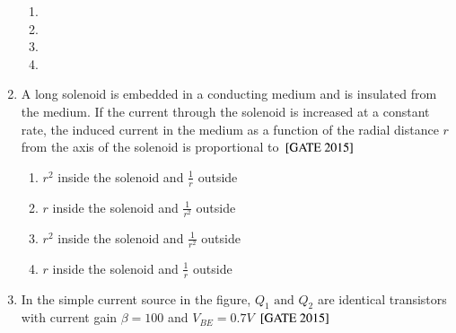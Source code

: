 \documentclass[journal]{IEEEtran}
\begin{document}
\begin{enumerate}
\begin{figure}[!ht]
\label{fig:my_label}
\end{figure}
\begin{multicols}{2}
\begin{enumerate}
   \item 
  \item 
   \columnbreak
    \item  
   \item {}%
      
    
\end{enumerate}
    
\end{multicols}


\item A long solenoid is embedded in a conducting medium and is insulated from the medium. If the current through the solenoid is increased at a constant rate, the induced current in the medium as a function of the radial distance $r$ from the axis of the solenoid is proportional to \hfill{${}\left[\text{GATE 2015}\right]$} 
\begin{multicols}{2}
\begin{enumerate}
    \item $r^2$ inside the solenoid and $\frac{1}{r}$ outside
    \item $r$ inside the solenoid and $\frac{1}{r^2}$ outside
 \item $r^2$ inside the solenoid and $\frac{1}{r^2}$ outside
  \item $r$ inside the solenoid and $\frac{1}{r}$ outside
\end{enumerate}
\end{multicols}
\item In the simple current source in the figure, $Q_1 \text{ and } Q_2$ are identical transistors with current gain $\beta = 100$ and $V_{BE} = 0.7 V$ \hfill{${}\left[\text{GATE 2015}\right]$} \\
\begin{figure}[!ht]
\centering
{}
\end{figure}
\end{enumerate}
\end{document}
